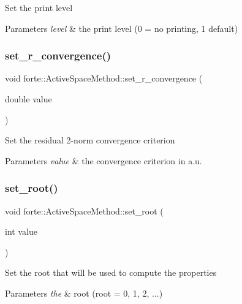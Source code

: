 Set the print level 
\begin{DoxyParams}{Parameters}
{\em level} & the print level (0 = no printing, 1 default) \\
\hline
\end{DoxyParams}
\mbox{\label{classforte_1_1_active_space_method_a59aad054d7966dc86ef01ea143fb1308}} 
\subsubsection{\texorpdfstring{set\+\_\+r\+\_\+convergence()}{set\_r\_convergence()}}
{\footnotesize\ttfamily void forte\+::\+Active\+Space\+Method\+::set\+\_\+r\+\_\+convergence (\begin{DoxyParamCaption}\item[{double}]{value }\end{DoxyParamCaption})}

Set the residual 2-\/norm convergence criterion 
\begin{DoxyParams}{Parameters}
{\em value} & the convergence criterion in a.\+u. \\
\hline
\end{DoxyParams}
\mbox{\label{classforte_1_1_active_space_method_a0abdfc8523b4c7e4fdd3a0e6a3d4bd13}} 
\subsubsection{\texorpdfstring{set\+\_\+root()}{set\_root()}}
{\footnotesize\ttfamily void forte\+::\+Active\+Space\+Method\+::set\+\_\+root (\begin{DoxyParamCaption}\item[{int}]{value }\end{DoxyParamCaption})}

Set the root that will be used to compute the properties 
\begin{DoxyParams}{Parameters}
{\em the} & root (root = 0, 1, 2, ...) \\
\hline
\end{DoxyParams}
\mbox{\label{classforte_1_1_active_space_method_a609f005cc7d3a1bc03ae517002eb19dc}} 
